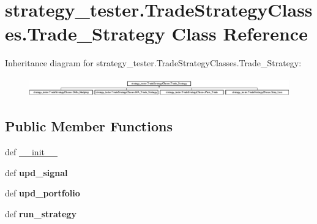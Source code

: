 \hypertarget{classstrategy__tester_1_1TradeStrategyClasses_1_1Trade__Strategy}{\section{strategy\-\_\-tester.\-Trade\-Strategy\-Classes.\-Trade\-\_\-\-Strategy \-Class \-Reference}
\label{classstrategy__tester_1_1TradeStrategyClasses_1_1Trade__Strategy}
}
\-Inheritance diagram for strategy\-\_\-tester.\-Trade\-Strategy\-Classes.\-Trade\-\_\-\-Strategy\-:\begin{figure}[H]
\begin{center}
\leavevmode
\includegraphics[height=0.802292cm]{classstrategy__tester_1_1TradeStrategyClasses_1_1Trade__Strategy}
\end{center}
\end{figure}
\subsection*{\-Public \-Member \-Functions}
\begin{DoxyCompactItemize}
\item 
def \hyperlink{classstrategy__tester_1_1TradeStrategyClasses_1_1Trade__Strategy_a8c9f0fb20285f4a900e6cfcea2896b69}{\-\_\-\-\_\-init\-\_\-\-\_\-}
\item 
\hypertarget{classstrategy__tester_1_1TradeStrategyClasses_1_1Trade__Strategy_a7ca0a9d46053901ccc129b7f8f3df6a0}{def {\bfseries upd\-\_\-signal}}\label{classstrategy__tester_1_1TradeStrategyClasses_1_1Trade__Strategy_a7ca0a9d46053901ccc129b7f8f3df6a0}

\item 
\hypertarget{classstrategy__tester_1_1TradeStrategyClasses_1_1Trade__Strategy_a0be395d0e98c8a349ed23de54a28b2d6}{def {\bfseries upd\-\_\-portfolio}}\label{classstrategy__tester_1_1TradeStrategyClasses_1_1Trade__Strategy_a0be395d0e98c8a349ed23de54a28b2d6}

\item 
\hypertarget{classstrategy__tester_1_1TradeStrategyClasses_1_1Trade__Strategy_ac765fd5d92b443d76d5771dbc498a0da}{def {\bfseries run\-\_\-strategy}}\label{classstrategy__tester_1_1TradeStrategyClasses_1_1Trade__Strategy_ac765fd5d92b443d76d5771dbc498a0da}

\end{DoxyCompactItemize}
